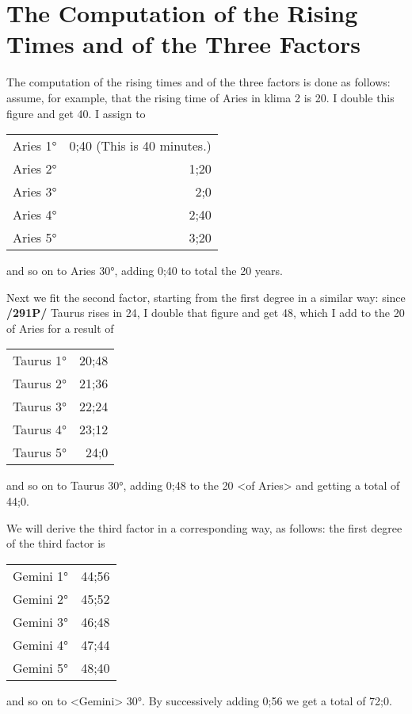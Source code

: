 \section{The Computation of the Rising Times and of the Three Factors}

The computation of the rising times and of the three factors is done as follows: assume, for example, that the rising time of Aries in klima 2 is 20. I double this figure and get 40. I assign to

\begin{tabular}{lr}
Aries 1° & 0;40 (This is 40 minutes.) \\
Aries 2° & 1;20 \\
Aries 3° & 2;0 \\
Aries 4° & 2;40 \\
Aries 5° & 3;20 \\
\end{tabular}

and so on to Aries 30°, adding 0;40 to total the 20 years.

Next we fit the second factor, starting from the first degree in a similar way: since \textbf{/291P/} Taurus rises in 24, I double that figure and get 48, which I add to the 20 of Aries for a result of 

\begin{tabular}{lr}
Taurus 1° & 20;48 \\
Taurus 2° & 21;36 \\
Taurus 3° & 22;24 \\
Taurus 4° & 23;12 \\
Taurus 5° & 24;0 \\
\end{tabular}

and so on to Taurus 30°, adding 0;48 to the 20 <of Aries> and getting a total of 44;0.

We will derive the third factor in a corresponding way, as follows: the first degree of the third factor is

\begin{tabular}{lr}
Gemini 1° & 44;56 \\
Gemini 2° & 45;52 \\
Gemini 3° & 46;48 \\
Gemini 4° & 47;44 \\
Gemini 5° & 48;40 \\
\end{tabular}

and so on to <Gemini> 30°. By successively adding 0;56 we get a total of 72;0.

